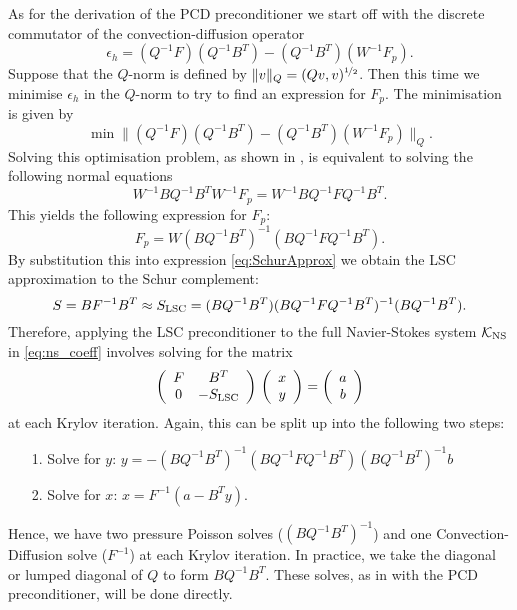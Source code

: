 As for the derivation of the PCD preconditioner we start off with the discrete commutator of the convection-diffusion operator
\begin{equation} \nonumber
    \epsilon_h = (Q^{-1}F)(Q^{-1}B^T)-(Q^{-1}B^T)(W^{-1}F_p).
\end{equation}
Suppose that the $Q$-norm is defined by $\|v\|_{Q} = (Qv,v)^{\nicefrac{1}{2}}$. Then this time we minimise $\epsilon_h$ in the $Q$-norm to try to find an expression for $F_p$. The minimisation is given by
$$\min \|(Q^{-1}F)(Q^{-1}B^T)-(Q^{-1}B^T)(W^{-1}F_p) \|_Q.$$
Solving this optimisation problem, as shown in \cite{elman2005finite}, is equivalent to solving the following normal equations
$$W^{-1}BQ^{-1}B^TW^{-1}F_p = W^{-1}BQ^{-1} FQ^{-1}B^T.$$
This yields the following expression for $F_p$:
$$F_p = W(BQ^{-1}B^T)^{-1}(BQ^{-1} FQ^{-1}B^T).$$
By substitution this into expression \eqref{eq:SchurApprox} we obtain the LSC approximation to the Schur complement:
\begin{equation} \nonumber
    S = BF^{-1}B^T \approx S_{\rm LSC} = (B Q^{-1} B^T)(BQ^{-1}FQ^{-1}B^T)^{-1}(B Q^{-1} B^T).
\end{equation}
Therefore, applying the LSC preconditioner to the full Navier-Stokes system $\mathcal{K}_{\rm NS}$ in \eqref{eq:ns_coeff} involves solving for the matrix
\begin{equation} \nonumber
\left(
\begin{array}{cc}
F & B^T \\
0 & -S_{\rm LSC}
\end{array}
\right)
\,
\left(
\begin{array}{c}
x \\
y
\end{array}
\right) =
\left(
\begin{array}{c}a\\b
\end{array}
\right)
\end{equation}
at each Krylov iteration. Again, this can be split up into the following two steps:
\begin{itemize}
    \item[1.] Solve for $y$: $y = -(B Q^{-1} B^T)^{-1}(BQ^{-1}FQ^{-1}B^T)(B Q^{-1} B^T)^{-1}b$
    \item[2.] Solve for $x$: $x = F^{-1}(a-B^Ty).$
\end{itemize}
Hence, we have two pressure Poisson solves ($(B Q^{-1} B^T)^{-1}$) and one Convection-Diffusion solve ($F^{-1}$) at each Krylov iteration. In practice, we take the diagonal or lumped diagonal of $Q$ to form $B Q^{-1} B^T$. These solves, as in with the PCD preconditioner, will be done directly.



